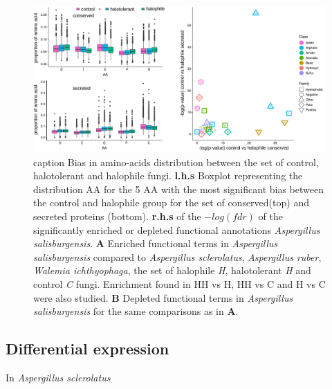 \documentclass[jof,article,submit,moreauthors,pdftex,10pt,a4paper]{Definitions/mdpi}
\newcommand{\aspRub}{\textit{Aspergillus ruber}}
\newcommand{\walIch}{\textit{Walemia ichthyophaga}}
\newcommand{\phiSp}{\textit{Aspergillus salisburgensis}}
\newcommand{\phiScl}{\textit{Aspergillus sclerolatus}}
\begin{document}

\begin{figure}
    \centering
    \includegraphics[width=0.9\linewidth]{AAAnalysis.pdf}
    caption{\label{fig:AABIAS} Bias in amino-acids distribution between the set of control, halotolerant and halophile fungi. \textbf{l.h.s} Boxplot representing the distribution AA for the 5 AA with the most significant bias between the control and halophile group  for the set of conserved(top) and secreted proteins (bottom). \textbf{r.h.s} of the $-log(fdr)$ of the significantly enriched or depleted functional annotations {\phiSp}. 
    \textbf{A} Enriched functional terms in {\phiSp} compared to {\phiScl}, {\aspRub}, {\walIch}, the set of halophile \textit{H}, halotolerant \textit{H} and control \textit{C} fungi. Enrichment found in HH vs H, HH vs C and H vs C were also studied. \textbf{B} Depleted functional terms in {\phiSp} for the same comparisons as in \textbf{A}.}
\end{figure}

\subsection{Differential expression}
In \phiScl{} 
\end{document}
